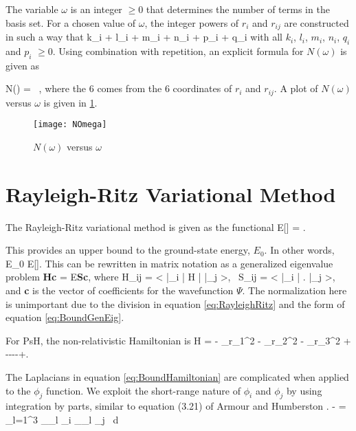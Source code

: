 \documentclass[Dissertation.tex]{subfiles}
\begin{document}
The variable $\omega$ is an integer $\geq 0$ that determines the number of terms in the basis set.  For a chosen value of $\omega$, the integer powers of $r_i$ and $r_{ij}$ are constructed in such a way that
\beq
\label{eq:OmegaDef}
k_i + l_i + m_i + n_i + p_i + q_i \leq \omega
\eeq
\noindent with all $k_i$, $l_i$, $m_i$, $n_i$, $q_i$ and $p_i$ $\geq 0$.  Using combination with repetition, an explicit formula for $N(\omega)$ is given as

\beq
\label{eq:NumberTermsOmega}
N(\omega) =  \, ,
\eeq
\noindent where the 6 comes from the 6 coordinates of $r_i$ and $r_{ij}$.  A plot of $N(\omega)$ versus $\omega$ is given in \cref{fig:NOmega}.

\begin{figure}[H]
	\centering
	\texttt{[image: NOmega]}
	\caption{$N(\omega)$ versus $\omega$}
	\label{fig:NOmega}
\end{figure}


\section{Rayleigh-Ritz Variational Method}
The Rayleigh-Ritz variational method is given as the functional \cite{Bransden2003}
\beq
\label{eq:RayleighRitz}
E[\Psi] = .
\eeq

\noindent This provides an upper bound to the ground-state energy, $E_0$.  In other words,
\beq
E_0 \leq E[\Psi].
\eeq
This can be rewritten in matrix notation as a generalized eigenvalue problem \cite{RayleighRitz}
\beq
\label{eq:BoundGenEig}
\textbf{Hc} = E\textbf{Sc},
\eeq
where
\beq
\label{eq:HijSij}
H_{ij} = \left< \bar{\phi}_i \left| H \right| \bar{\phi}_j \right>\!, \, S_{ij} = \left< \bar{\phi}_i \left| \right.\! \bar{\phi}_j \right>, 
\eeq
and \textbf{c} is the vector of coefficients for the wavefunction $\Psi$.  The normalization here is unimportant due to the division in equation \ref{eq:RayleighRitz} and the form of equation \ref{eq:BoundGenEig}.

For PsH, the non-relativistic Hamiltonian is
\beq
\label{eq:BoundHamiltonian}
H = - \nabla_{r_1}^2 -  \nabla_{r_2}^2 -  \nabla_{r_3}^2 + ----+.
\eeq

The Laplacians in equation \ref{eq:BoundHamiltonian} are complicated when applied to the $\phi_j$ function.  We exploit the short-range nature of $\phi_i$ and $\phi_j$ by using integration by parts, similar to equation (3.21) of Armour and Humberston \cite{Armour1991}.
\beq
\label{eq:BoundGradient}
- = \int \sum_{l=1}^3 \bm{\nabla}_{\!_l} \phi_i \bm{\cdot} \bm{\nabla}_{\!_l} \phi_j \, d\tau
\eeq
\end{document}
